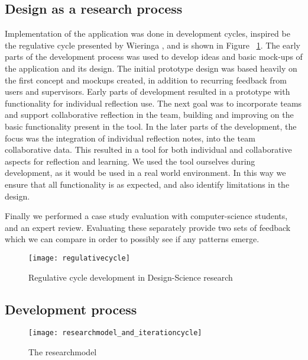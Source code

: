 \subsection{Design as a research process}
Implementation of the application was done in development cycles, inspired be the regulative cycle presented by Wieringa \cite{wieringa}, and is shown in Figure ~\ref{regulativecycle}. 
The early parts of the development process was used to develop ideas and basic mock-ups of the application and its design. The initial prototype design was based heavily on the first concept and mockups created, in addition to recurring feedback from users and supervisors. Early parts of development resulted in a prototype with functionality for individual reflection use. The next goal was to incorporate teams and support collaborative reflection in the team, building and improving on the basic functionality present in the tool. In the later parts of the development, the focus was the integration of individual reflection notes, into the team collaborative data. This resulted in a tool for both individual and collaborative aspects for reflection and learning. We used the tool ourselves during development, as it would be used in a real world environment. In this way we ensure that all functionality is as expected, and also identify limitations in the design. 

Finally we performed a case study evaluation with computer-science students, and an expert review. Evaluating these separately provide two sets of feedback which we can compare in order to possibly see if any patterns emerge. 
\begin{figure}[!htpb]
\centering
	\texttt{[image: regulativecycle]}
\caption{Regulative cycle development in Design-Science research}
\label{regulativecycle}
\end{figure}

\subsection{Development process}
\begin{figure}[!htpb]
\centering
	\texttt{[image: researchmodel\_and\_iterationcycle]}
\caption{The researchmodel}
\label{researchmodel}
\end{figure}

